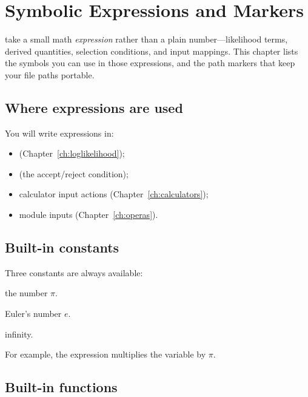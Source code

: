 \chapter{Symbolic Expressions and Markers}
\label{ch:symbols}

 take a small math \emph{expression} rather than a plain
number---likelihood terms, derived quantities, selection conditions, and input mappings. This
chapter lists the symbols you can use in those expressions, and the path markers that keep your
file paths portable.

\section{Where expressions are used}
\label{sec:expr-where}

You will write expressions in:

\begin{itemize}
  \item {} (Chapter~\ref{ch:loglikelihood});
  \item {} (the accept/reject condition);
  \item calculator input actions (Chapter~\ref{ch:calculators});
  \item {} module inputs (Chapter~\ref{ch:operas}).
\end{itemize}

\section{Built-in constants}
\label{sec:expr-constants}

Three constants are always available:

\begin{description}[style=nextline, leftmargin=1.2em]
  \item[\code{Pi}] the number $\pi$.
  \item[\code{E}] Euler's number $e$.
  \item[\code{Inf}] infinity.
\end{description}

\noindent For example, the expression  multiplies the variable  by $\pi$.

\section{Built-in functions}
\label{sec:expr-functions}

